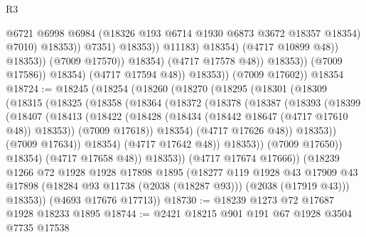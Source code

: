 \begin{lexlean}{R3}
\begin{coremodule}
                                                @6721
                                                @6998
                                                @6984
                                                (@18326 @193 @6714 @1930 @6873 @3672 @18357 @18354)
                                                @7010)
                                              @18353))
                                          @7351)
                                        @18353))
                                    @11183)
                                  @18354)
                                (@4717 @10899 @48))
                              @18353))
                          (@7009 @17570))
                        @18354)
                      (@4717 @17578 @48))
                    @18353))
                (@7009 @17586))
              @18354)
            (@4717 @17594 @48))
          @18353))
      (@7009 @17602))
    @18354
@18724 := @18245
    (@18254
      (@18260
        (@18270
          (@18295
            (@18301
              (@18309
                (@18315
                  (@18325
                    (@18358
                      (@18364
                        (@18372
                          (@18378
                            (@18387
                              (@18393
                                (@18399
                                  (@18407
                                    (@18413
                                      (@18422
                                        (@18428 (@18434 (@18442 @18647 (@4717 @17610 @48)) @18353))
                                        (@7009 @17618))
                                      @18354)
                                    (@4717 @17626 @48))
                                  @18353))
                              (@7009 @17634))
                            @18354)
                          (@4717 @17642 @48))
                        @18353))
                    (@7009 @17650))
                  @18354)
                (@4717 @17658 @48))
              @18353))
          (@4717 @17674 @17666))
        (@18239
          @1266
          @72
          @1928
          @1928
          @17898
          @1895
          (@18277
            @119
            @1928
            @43
            @17909
            @43
            @17898
            (@18284 @93 @11738 (@2038 (@18287 @93)))
            (@2038 (@17919 @43)))
          @18353))
      (@4693 @17676 @17713))
@18730 := @18239 @1273 @72 @17687 @1928 @18233 @1895
@18744 := @2421
    @18215
    @901
    @191
    @67
    @1928
    @3504
    @7735
    @17538

\end{coremodule}
\end{lexlean}
